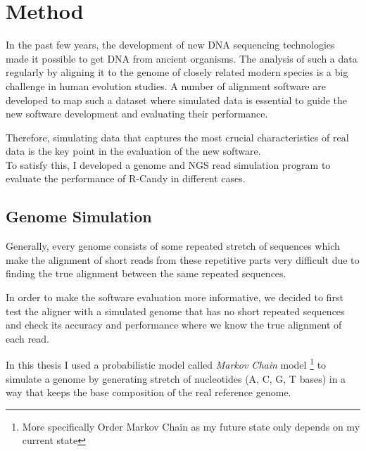 \documentclass[11pt,a4paper]{report}
\begin{document}


\section{Method} \label{Method}

In the past few years, the development of new DNA sequencing technologies made 
it possible to get DNA from ancient organisms.
The analysis of such a data regularly by aligning it to the genome of closely 
related modern species is a big challenge in human evolution studies.
A number of alignment software are developed to map such a dataset where 
simulated data is essential to guide the new software development and 
evaluating their performance.

Therefore, simulating data that captures the most crucial characteristics 
of real data is the key point in the evaluation of the new software.\\

To satisfy this, I developed a genome and NGS read simulation program to evaluate 
the performance of R-Candy in different cases.



\subsection{Genome Simulation} 
\label{ Genome Simulation }

Generally, every genome consists of some repeated stretch of sequences which make 
the alignment of short reads from these repetitive parts very difficult due to 
finding the true alignment between the same repeated sequences.

In order to make the software evaluation more informative, we decided to first 
test the aligner with a simulated genome that has no short repeated sequences 
and check its accuracy and performance where we know the true alignment of each 
read.

In this thesis I used a probabilistic model called \emph{Markov Chain} model 
\footnote{More specifically  Order Markov Chain as my future state only 
depends on my current state} to simulate a genome by generating stretch of 
nucleotides (A, C, G, T bases) in a way that  keeps the base composition of the 
real reference genome.
 
\end{document}
